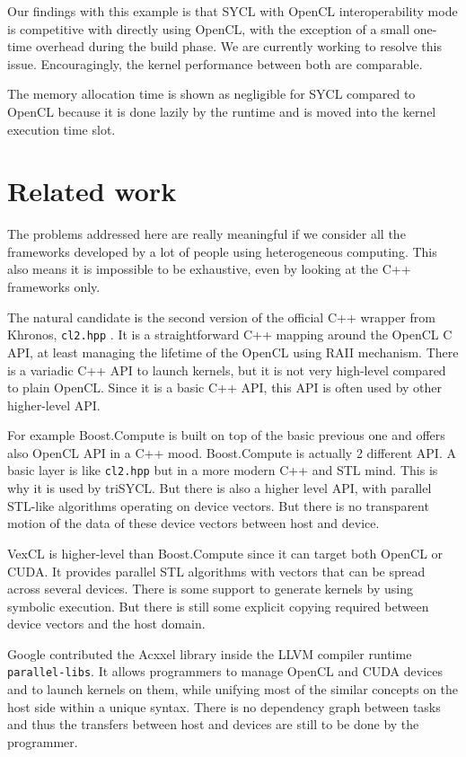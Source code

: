 \documentclass[sigplan]{acmart}
\begin{document}
Our findings with this example is that SYCL with OpenCL interoperability mode is competitive with directly using OpenCL, with the exception of a small one-time overhead during the build phase. We are currently working to resolve this issue. Encouragingly, the kernel performance between both are comparable.

The memory allocation time is shown as negligible for SYCL compared to
OpenCL because it is done lazily by the runtime and is moved into the
kernel execution time slot.


\section{Related work}
\label{sec:related-work}

The problems addressed here are really meaningful if we consider all
the frameworks developed by a lot of people using heterogeneous
computing. This also means it is impossible to be exhaustive, even by
looking at the C++ frameworks only.

The natural candidate is the second version of the official C++
wrapper from Khronos, \texttt{cl2.hpp} \cite{cl2.hpp}. It is a
straightforward C++ mapping around the OpenCL C API, at least managing
the lifetime of the OpenCL using RAII mechanism. There is a variadic
C++ API to launch kernels, but it is not very high-level compared
to plain OpenCL. Since it is a basic C++ API, this API is often
used by other higher-level API.

For example Boost.Compute \cite{Boost.Compute} is built on top of the
basic previous one and offers also OpenCL API in a C++ mood.
Boost.Compute is actually 2 different API. A basic layer is like
\texttt{cl2.hpp} but in a more modern C++ and STL mind. This is why it
is used by triSYCL. But there is also a higher level API, with
parallel STL-like algorithms operating on device vectors. But there is
no transparent motion of the data of these device vectors between host
and device.

VexCL \cite{VexCL} is higher-level than Boost.Compute since it can
target both OpenCL or CUDA. It provides parallel STL algorithms with
vectors that can be spread across several devices. There is some
support to generate kernels by using symbolic execution. But there is
still some explicit copying required between device vectors and the host domain.

Google contributed the Acxxel library \cite{Acxxel-4.0} inside the
LLVM compiler runtime \texttt{parallel-libs}. It allows programmers to manage
OpenCL and CUDA devices and to launch kernels on them, while unifying
most of the similar concepts on the host side within a unique
syntax. There is no dependency graph between tasks and thus the
transfers between host and devices are still to be done by the
programmer.
\end{document}
